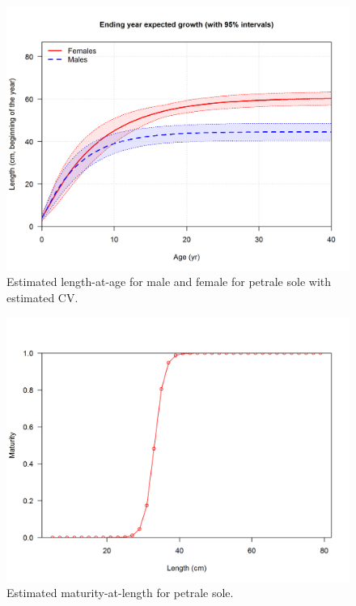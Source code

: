 \documentclass[12pt,]{article}
\begin{document}
\begin{figure}
\centering
\includegraphics{r4ss/plots_mod1/bio1_sizeatage.png}
\caption{Estimated length-at-age for male and female for petrale sole
with estimated CV. \label{fig:sizeatage}}
\end{figure}

\FloatBarrier 

\begin{figure}
\centering
\includegraphics{r4ss/plots_mod1/bio6_maturity.png}
\caption{Estimated maturity-at-length for petrale sole.
\label{fig:maturity}}
\end{figure}

\FloatBarrier
\end{document}
